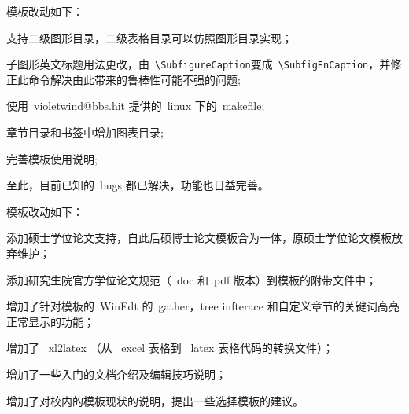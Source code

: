 模板改动如下：
\begin{hitlist}
  \item 支持二级图形目录，二级表格目录可以仿照图形目录实现；
  \item 子图形英文标题用法更改，由~\verb|\SubfigureCaption|变成~\verb|\SubfigEnCaption|，并修正此命令解决由此带来的鲁棒性可能不强的问题;
  \item 使用~violetwind@bbs.hit 提供的~linux 下的~makefile;
  \item 章节目录和书签中增加图表目录;
  \item 完善模板使用说明;
  \item 至此，目前已知的~bugs 都已解决，功能也日益完善。
\end{hitlist}

模板改动如下：
\begin{hitlist}
  \item 添加硕士学位论文支持，自此后硕博士论文模板合为一体，原硕士学位论文模板放弃维护；
  \item 添加研究生院官方学位论文规范（~doc 和~pdf 版本）到模板的附带文件中；
  \item 增加了针对模板的~WinEdt 的~gather，tree infterace 和自定义章节的关键词高亮正常显示的功能；
  \item 增加了~ xl2latex （从~ excel 表格到~ latex 表格代码的转换文件）；
  \item 增加了一些入门的文档介绍及编辑技巧说明；
  \item 增加了对校内的模板现状的说明，提出一些选择模板的建议。
\end{hitlist}


